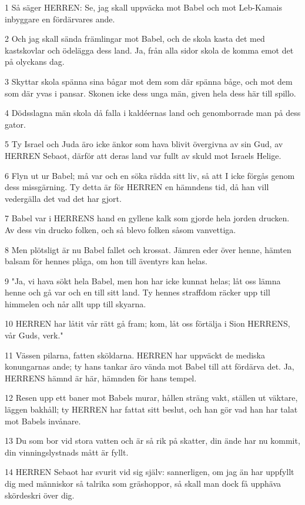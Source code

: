 \par 1 Så säger HERREN: Se, jag skall uppväcka mot Babel och mot Leb-Kamais inbyggare en fördärvares ande.
\par 2 Och jag skall sända främlingar mot Babel, och de skola kasta det med kastskovlar och ödelägga dess land. Ja, från alla sidor skola de komma emot det på olyckans dag.
\par 3 Skyttar skola spänna sina bågar mot dem som där spänna båge, och mot dem som där yvas i pansar. Skonen icke dess unga män, given hela dess här till spillo.
\par 4 Dödsslagna män skola då falla i kaldéernas land och genomborrade man på dess gator.
\par 5 Ty Israel och Juda äro icke änkor som hava blivit övergivna av sin Gud, av HERREN Sebaot, därför att deras land var fullt av skuld mot Israels Helige.
\par 6 Flyn ut ur Babel; må var och en söka rädda sitt liv, så att I icke förgås genom dess missgärning. Ty detta är för HERREN en hämndens tid, då han vill vedergälla det vad det har gjort.
\par 7 Babel var i HERRENS hand en gyllene kalk som gjorde hela jorden drucken. Av dess vin drucko folken, och så blevo folken såsom vanvettiga.
\par 8 Men plötsligt är nu Babel fallet och krossat. Jämren eder över henne, hämten balsam för hennes plåga, om hon till äventyrs kan helas.
\par 9 "Ja, vi hava sökt hela Babel, men hon har icke kunnat helas; låt oss lämna henne och gå var och en till sitt land. Ty hennes straffdom räcker upp till himmelen och når allt upp till skyarna.
\par 10 HERREN har låtit vår rätt gå fram; kom, låt oss förtälja i Sion HERRENS, vår Guds, verk."
\par 11 Vässen pilarna, fatten sköldarna. HERREN har uppväckt de mediska konungarnas ande; ty hans tankar äro vända mot Babel till att fördärva det. Ja, HERRENS hämnd är här, hämnden för hans tempel.
\par 12 Resen upp ett baner mot Babels murar, hållen sträng vakt, ställen ut väktare, läggen bakhåll; ty HERREN har fattat sitt beslut, och han gör vad han har talat mot Babels invånare.
\par 13 Du som bor vid stora vatten och är så rik på skatter, din ände har nu kommit, din vinningslystnads mått är fyllt.
\par 14 HERREN Sebaot har svurit vid sig själv: sannerligen, om jag än har uppfyllt dig med människor så talrika som gräshoppor, så skall man dock få upphäva skördeskri över dig.
